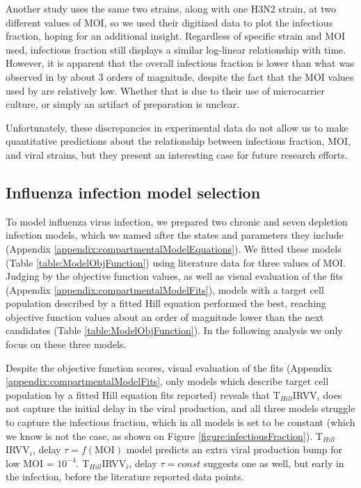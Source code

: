 Another study \cite{schulze2009infection} uses the same two strains, along with one H3N2 strain, at two different values of MOI, so we used their digitized data to plot the infectious fraction, hoping for an additional insight. Regardless of specific strain and MOI used, infectious fraction still displays a similar log-linear relationship with time. However, it is apparent that the overall infectious fraction is lower than what was observed in \cite{rudiger2019multiscale, frensing2016influenza} by about 3 orders of magnitude, despite the fact that the MOI values used by \cite{schulze2009infection} are relatively low. Whether that is due to their use of microcarrier culture, or simply an artifact of preparation is unclear.

Unfortunately, these discrepancies in experimental data do not allow us to make quantitative predictions about the relationship between infectious fraction, MOI, and viral strains, but they present an interesting case for future research efforts.

\subsection{Influenza infection model selection}

To model influenza virus infection, we prepared two chronic and seven depletion infection models, which we named after the states and parameters they include (Appendix \ref{appendix:compartmentalModelEquations}). We fitted these models (Table \ref{table:ModelObjFunction}) using literature data \cite{rudiger2019multiscale, frensing2016influenza} for three values of MOI. Judging by the objective function values, as well as visual evaluation of the fits (Appendix \ref{appendix:compartmentalModelFits}), models with a target cell population described by a fitted Hill equation performed the best, reaching objective function values about an order of magnitude lower than the next candidates (Table \ref{table:ModelObjFunction}). In the following analysis we only focus on these three models.

Despite the objective function scores, visual evaluation of the fits (Appendix \ref{appendix:compartmentalModelFits}, only models which describe target cell population by a fitted Hill equation fits reported) reveals that T$_{Hill}$IRVV$_i$ does not capture the initial delay in the viral production, and all three models struggle to capture the infectious fraction, which in all models is set to be constant (which we know is not the case, as shown on Figure \ref{figure:infectiousFraction}). T$_{Hill}$IRVV$_i$, delay $\tau = f(\text{MOI})$ model predicts an extra viral production bump for low MOI = $10^{-4}$. T$_{Hill}$IRVV$_i$, delay $\tau = const$ suggests one as well, but early in the infection, before the literature reported data points.

